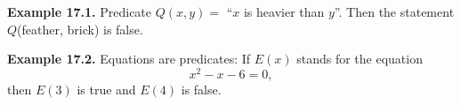 \documentclass[aspectratio=169]{beamer}
\providecommand{\Blue}[1]{\textcolor{blue}{#1}}
\begin{document}


       

\begin{frame}[plain]{}

  {\bf Example 17.1.} Predicate $Q(x, y) =$ ``$x$ is heavier than $y$''. Then
         the statement $Q$(feather, brick) is false.
  \medskip
  \pause 
  
  {\bf Example 17.2.} Equations are predicates: If $E(x)$ stands for the equation
      \[ x^2-x-6 = 0, \]
      then $E(3)$ is true and $E(4)$ is false.
      
  
  \vspace{1in}
  
      
\end{frame}
\end{document}
